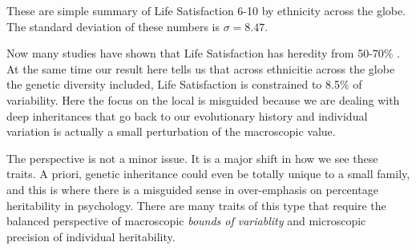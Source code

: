 \documentclass{amsart}
\begin{document}
These are simple summary of Life Satisfaction 6-10 by ethnicity across the globe.  The standard deviation of these numbers is $\sigma=8.47$.

Now many studies have shown that Life Satisfaction has heredity from 50-70\% \cite{BPD}.  At the same time our result here tells us that across ethnicitie across the globe the genetic diversity included, Life Satisfaction is constrained to 8.5\% of variability.  Here the focus on the local is misguided because we are dealing with deep inheritances that go back to our evolutionary history and individual variation is actually a small perturbation of the macroscopic value.  

The perspective is not a minor issue.  It is a major shift in how we see these traits.  A priori, genetic inheritance could even be totally unique to a small family, and this is where there is a misguided sense in over-emphasis on percentage heritability in psychology.  There are many traits of this type that require the balanced perspective of macroscopic {\em bounds of variablity} and microscopic precision of individual heritability.


\begin{thebibliography}{CCCC}
\end{thebibliography}
\end{document}
